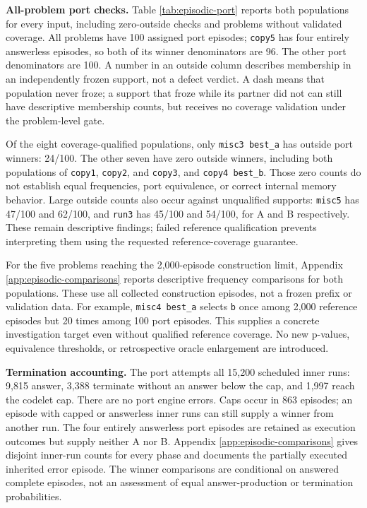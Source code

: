 \documentclass[10pt,letterpaper]{article}
\begin{document}
\textbf{All-problem port checks.} Table \ref{tab:episodic-port} reports both populations
for every input, including zero-outside checks and problems without validated coverage.
All problems have 100 assigned port episodes; \texttt{copy5} has four entirely answerless
episodes, so both of its winner denominators are 96. The other port denominators are 100.
A number in an outside column describes membership in an independently frozen support, not
a defect verdict. A dash means that population never froze; a support that froze while its
partner did not can still have descriptive membership counts, but receives no coverage
validation under the problem-level gate.



Of the eight coverage-qualified populations, only \texttt{misc3\ best\_a} has outside port
winners: 24/100. The other seven have zero outside winners, including both populations of
\texttt{copy1}, \texttt{copy2}, and \texttt{copy3}, and \texttt{copy4\ best\_b}. Those
zero counts do not establish equal frequencies, port equivalence, or correct internal
memory behavior. Large outside counts also occur against unqualified supports:
\texttt{misc5} has 47/100 and 62/100, and \texttt{run3} has 45/100 and 54/100, for A and B
respectively. These remain descriptive findings; failed reference qualification prevents
interpreting them using the requested reference-coverage guarantee.

For the five problems reaching the 2,000-episode construction limit, Appendix
\ref{app:episodic-comparisons} reports descriptive frequency comparisons for both
populations. These use all collected construction episodes, not a frozen prefix or
validation data. For example, \texttt{misc4\ best\_a} selects \texttt{b} once among 2,000
reference episodes but 20 times among 100 port episodes. This supplies a concrete
investigation target even without qualified reference coverage. No new p-values,
equivalence thresholds, or retrospective oracle enlargement are introduced.

\textbf{Termination accounting.} The port attempts all 15,200 scheduled inner runs: 9,815
answer, 3,388 terminate without an answer below the cap, and 1,997 reach the codelet cap.
There are no port engine errors. Caps occur in 863 episodes; an episode with capped or
answerless inner runs can still supply a winner from another run. The four entirely
answerless port episodes are retained as execution outcomes but supply neither A nor B.
Appendix \ref{app:episodic-comparisons} gives disjoint inner-run counts for every phase
and documents the partially executed inherited error episode. The winner comparisons are
conditional on answered complete episodes, not an assessment of equal answer-production or
termination probabilities.
\end{document}
